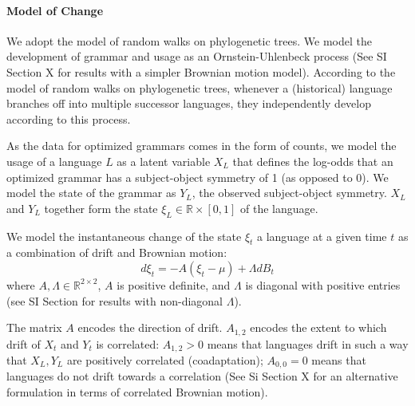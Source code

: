 \documentclass[11pt,a4paper]{article}
\begin{document}
\paragraph{Model of Change}



We adopt the model of random walks on phylogenetic trees.
We model the development of grammar and usage as an Ornstein-Uhlenbeck process (See SI Section X for results with a simpler Brownian motion model).
According to the model of random walks on phylogenetic trees, whenever a (historical) language branches off into multiple successor languages, they independently develop according to this process.


As the data for optimized grammars comes in the form of counts, we model the usage of a language $L$ as a latent variable $X_L$ that defines the log-odds that an optimized grammar has a subject-object symmetry of 1 (as opposed to 0).
We model the state of the grammar as $Y_L$, the observed subject-object symmetry.
$X_L$ and $Y_L$ together form the state $\xi_L \in \mathbb{R} \times [0,1]$  of the language.

We model the instantaneous change of the state $\xi_t$ a language at a given time $t$ as a combination of drift and Brownian motion:
\begin{equation*}
    d\xi_t = -A(\xi_t-\mu) + \Lambda dB_t
\end{equation*}
where $A, \Lambda \in \mathbb{R}^{2\times 2}$, $A$ is positive definite, and $\Lambda$ is diagonal with positive entries (see SI Section for results with non-diagonal $\Lambda$).


The matrix $A$ encodes the direction of drift.
$A_{1,2}$ encodes the extent to which drift of $X_t$ and $Y_t$ is correlated:
$A_{1,2} > 0$ means that languages drift in such a way that $X_L, Y_L$ are positively correlated (coadaptation); $A_{0,0} = 0$ means that languages do not drift towards a correlation (See Si Section X for an alternative formulation in terms of correlated Brownian motion).
\end{document}
